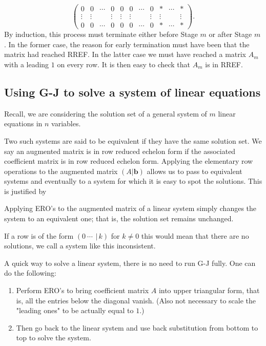 \documentclass[10pt, a4paper]{article}
\newcommand{\mbf}[1]{\mathbf{#1}}
\begin{document}
\begin{enumerate}[label = (\roman*).]
\[\begin{pmatrix}
        0 & 0 & \dotsi & 0 & 0 & 0 & \dotsi & 0 & * & \dotsi & * \\
        \vdots & \vdots & \phantom{} & \vdots & \vdots & \vdots & \phantom{} & \vdots & \vdots & \phantom{} & \vdots \\
        0 & 0 & \dotsi & 0 & 0 & 0 & \dotsi & 0 & * & \dotsi & *
    \end{pmatrix}.
    \]
    By induction, this process must terminate either before Stage $m$ or after Stage $m$.
    In the former case,
    the reason for early termination must have been that the matrix had reached RREF.
    In the latter case we must have reached a matrix $A_m$ with a leading $1$ on every row.
    It is then easy to check that $A_m$ is in RREF.
\end{enumerate}

\subsection{Using G-J to solve a system of linear equations}
Recall, we are considering the solution set of a general system of $m$ linear equations in $n$ variables.

Two such systems are said to be equivalent if they have the same solution set.
We say an augmented matrix is in row reduced echelon form if the associated coefficient matrix is in row reduced echelon form.
Applying the elementary row operations to the augmented matrix $(A | \mbf{b})$ allows us to pass to equivalent systems and eventually to a system for which it is easy to spot the solutions.
This is justified by
\begin{theorem}[label = thm:lintoech]\label{linalg_thm_lintoech}
    Applying ERO's to the augmented matrix of a linear system simply changes the system to an equivalent one; that is, the solution set remains unchanged.
\end{theorem}

If a row is of the form $(0\ \dotsi\ \,|\, k)$ for $k \neq 0$ this would mean that there are no solutions,
we call a system like this inconsistent.

A quick way to solve a linear system,
there is no need to run G-J fully.
One can do the following:
\begin{enumerate}[label = \arabic*) :]
    \item Perform ERO's to bring coefficient matrix $A$ into upper triangular form,
    that is, all the entries below the diagonal vanish.
    (Also not necessary to scale the "leading ones" to be actually equal to $1$.)
    \item Then go back to the linear system and use back substitution from bottom to top to solve the system.
\end{enumerate}
\end{document}
